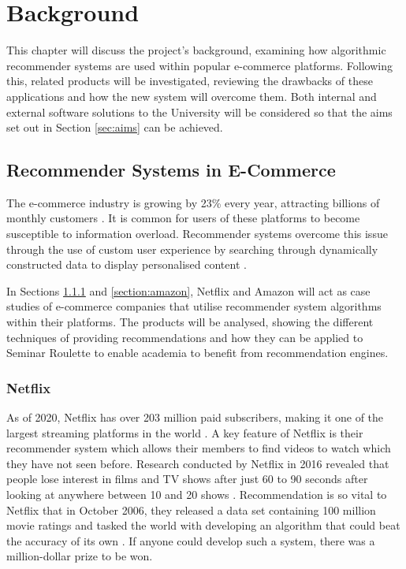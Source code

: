 \documentclass{l4proj}
\begin{document}
\chapter{Background}
\label{chapter:background}

This chapter will discuss the project's background, examining how algorithmic recommender systems are used within popular e-commerce platforms. Following this, related products will be investigated, reviewing the drawbacks of these applications and how the new system will overcome them. Both internal and external software solutions to the University will be considered so that the aims set out in Section \ref{sec:aims} can be achieved.

\section{Recommender Systems in E-Commerce}

The e-commerce industry is growing by 23\% every year, attracting billions of monthly customers \citep{ecommercestats}. It is common for users of these platforms to become susceptible to information overload. Recommender systems overcome this issue through the use of custom user experience by searching through dynamically constructed data to display personalised content \citep{ISINKAYE2015261}.

In Sections \ref{section:netflix} and \ref{section:amazon}, Netflix and Amazon will act as case studies of e-commerce companies that utilise recommender system algorithms within their platforms. The products will be analysed, showing the different techniques of providing recommendations and how they can be applied to Seminar Roulette to enable academia to benefit from recommendation engines.

\subsection{Netflix}
\label{section:netflix}

As of 2020, Netflix has over 203 million paid subscribers, making it one of the largest streaming platforms in the world \citep{netflixstats}. A key feature of Netflix is their recommender system which allows their members to find videos to watch which they have not seen before. Research conducted by Netflix in 2016 revealed that people lose interest in films and TV shows after just 60 to 90 seconds after looking at anywhere between 10 and 20 shows \citep{10.1145/2843948}. Recommendation is so vital to Netflix that in October 2006, they released a data set containing 100 million movie ratings and tasked the world with developing an algorithm that could beat the accuracy of its own \citep{Bennett07thenetflix}. If anyone could develop such a system, there was a million-dollar prize to be won.
\end{document}
